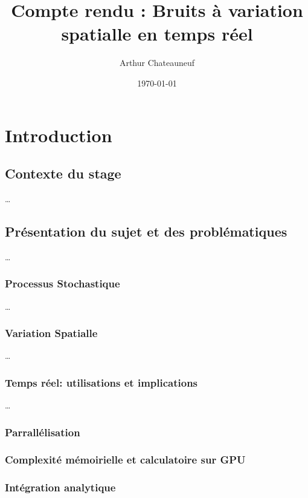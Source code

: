 \documentclass[twocolumn]{article} %
\title{Compte rendu : Bruits à variation spatialle en temps réel} %
\author{Arthur Chateauneuf} %
\date{\today} %
\begin{document}
\maketitle %

\onecolumn
\tableofcontents
\twocolumn

\clearpage

\section{Introduction}

\subsection{Contexte du stage}
\ldots

\subsection{Présentation du sujet et des problématiques}
\ldots

\subsubsection{Processus Stochastique}
\ldots

\subsubsection{Variation Spatialle}
\ldots

\subsubsection{Temps réel: utilisations et implications}
\ldots

\subsubsection{Parrallélisation}
\subsubsection{Complexité mémoirielle et calculatoire sur GPU}
\subsubsection{Intégration analytique}
\end{document}
